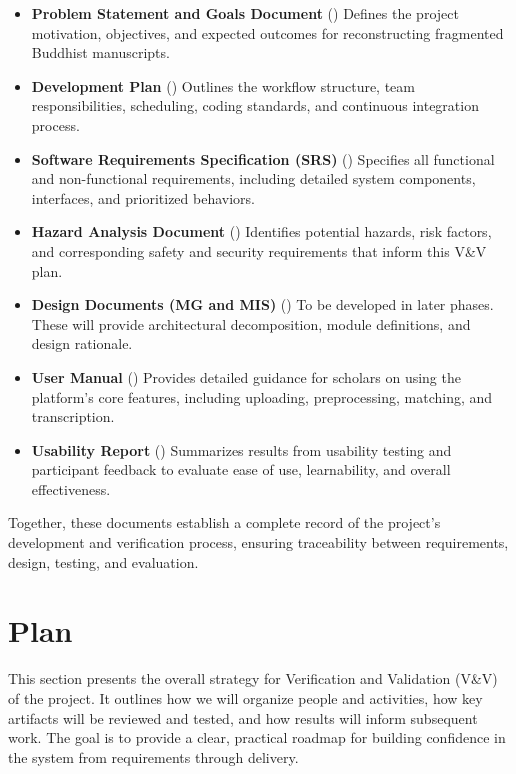 \documentclass[12pt, titlepage]{article}
\begin{document}
\begin{itemize}
    \item \textbf{Problem Statement and Goals Document} (\citet{ProblemStatement})  
    Defines the project motivation, objectives, and expected outcomes for reconstructing fragmented Buddhist manuscripts.

    \item \textbf{Development Plan} (\citet{DevelopmentPlan})  
    Outlines the workflow structure, team responsibilities, scheduling, coding standards, and continuous integration process.

    \item \textbf{Software Requirements Specification (SRS)} (\citet{SRS-Sanskrit-Ciphers})  
    Specifies all functional and non-functional requirements, including detailed system components, interfaces, and prioritized behaviors.

    \item \textbf{Hazard Analysis Document} (\citet{HazardAnalysis})  
    Identifies potential hazards, risk factors, and corresponding safety and security requirements that inform this V\&V plan.

    \item \textbf{Design Documents (MG and MIS)} (\citet{DesignDocs})  
    To be developed in later phases. These will provide architectural decomposition, module definitions, and design rationale.

    \item \textbf{User Manual} (\citet{UserManual})  
    Provides detailed guidance for scholars on using the platform’s core features, including uploading, preprocessing, matching, and transcription.

    \item \textbf{Usability Report} (\citet{UsabilityReport})  
    Summarizes results from usability testing and participant feedback to evaluate ease of use, learnability, and overall effectiveness.
\end{itemize}

Together, these documents establish a complete record of the project’s development and verification process, ensuring traceability between requirements, design, testing, and evaluation.

\section{Plan}

This section presents the overall strategy for Verification and Validation (V\&V) of the project. It outlines how we will organize people and activities, how key artifacts will be reviewed and tested, and how results will inform subsequent work. The goal is to provide a clear, practical roadmap for building confidence in the system from requirements through delivery.
\end{document}
